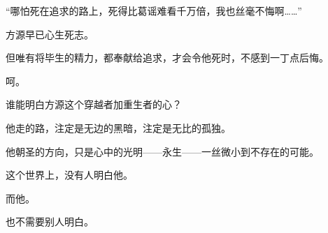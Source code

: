 \begin{this_body}
“哪怕死在追求的路上，死得比葛谣难看千万倍，我也丝毫不悔啊……”

方源早已心生死志。

但唯有将毕生的精力，都奉献给追求，才会令他死时，不感到一丁点后悔。

呵。

谁能明白方源这个穿越者加重生者的心？

他走的路，注定是无边的黑暗，注定是无比的孤独。

他朝圣的方向，只是心中的光明——永生——一丝微小到不存在的可能。

这个世界上，没有人明白他。

而他。

也不需要别人明白。

\end{this_body}

